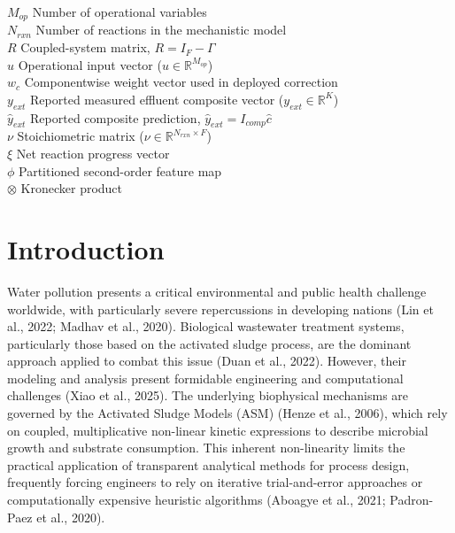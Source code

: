 \documentclass[11pt]{article}
\begin{document}
\begin{tabbing}
$M_{op}$ \> Number of operational variables \\
$N_{rxn}$ \> Number of reactions in the mechanistic model \\
$R$ \> Coupled-system matrix, $R = I_F - \Gamma$ \\
$u$ \> Operational input vector ($u \in \mathbb{R}^{M_{op}}$) \\
$w_c$ \> Componentwise weight vector used in deployed correction \\
$y_{ext}$ \> Reported measured effluent composite vector ($y_{ext} \in \mathbb{R}^{K}$) \\
$\hat{y}_{ext}$ \> Reported composite prediction, $\hat{y}_{ext} = I_{comp}\hat{c}$ \\
$\nu$ \> Stoichiometric matrix ($\nu \in \mathbb{R}^{N_{rxn} \times F}$) \\
$\xi$ \> Net reaction progress vector \\
$\phi$ \> Partitioned second-order feature map \\
$\otimes$ \> Kronecker product \\
\end{tabbing}

\section{Introduction}

Water pollution presents a critical environmental and public health challenge worldwide, with particularly severe repercussions in developing nations (Lin et al., 2022; Madhav et al., 2020). Biological wastewater treatment systems, particularly those based on the activated sludge process, are the dominant approach applied to combat this issue (Duan et al., 2022). However, their modeling and analysis present formidable engineering and computational challenges (Xiao et al., 2025). The underlying biophysical mechanisms are governed by the Activated Sludge Models (ASM) (Henze et al., 2006), which rely on coupled, multiplicative non-linear kinetic expressions to describe microbial growth and substrate consumption. This inherent non-linearity limits the practical application of transparent analytical methods for process design, frequently forcing engineers to rely on iterative trial-and-error approaches or computationally expensive heuristic algorithms (Aboagye et al., 2021; Padron-Paez et al., 2020).
\end{document}
